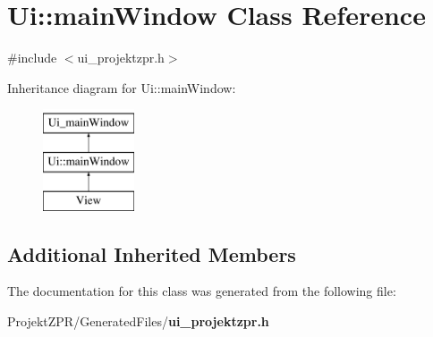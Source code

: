 \section{Ui\-:\-:main\-Window Class Reference}
\label{class_ui_1_1main_window}


{\ttfamily \#include $<$ui\-\_\-projektzpr.\-h$>$}

Inheritance diagram for Ui\-:\-:main\-Window\-:\begin{figure}[H]
\begin{center}
\leavevmode
\includegraphics[height=3.000000cm]{class_ui_1_1main_window}
\end{center}
\end{figure}
\subsection*{Additional Inherited Members}


The documentation for this class was generated from the following file\-:\begin{DoxyCompactItemize}
\item 
Projekt\-Z\-P\-R/\-Generated\-Files/{\bf ui\-\_\-projektzpr.\-h}\end{DoxyCompactItemize}
